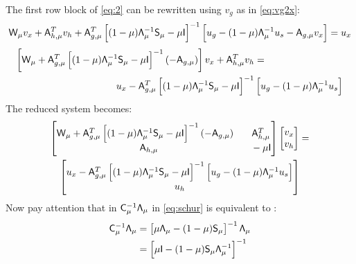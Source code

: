 The first row block of \eqref{eq:2} can be rewritten using $v_g$ as in \eqref{eq:vg2x}:
\begin{equation*}
 \mathsf{W}_\mu v_x +  \mathsf{A}_{h,\mu}^T v_h  + \mathsf{A}_{g,\mu}^T  \left[ (1-\mu)   \mathsf{\Lambda}_\mu ^{-1} \mathsf{S}_\mu   -\mu \mathsf{I} \right]^{-1} \left[  u_g -    (1-\mu) \mathsf{\Lambda}_\mu ^{-1} u_s  -   \mathsf{A}_{g,\mu} v_x   \right] =u_x 
 \end{equation*}
\begin{equation*} 
\begin{aligned}
\left[ \mathsf{W}_\mu +  \mathsf{A}_{g,\mu}^T \left[ (1-\mu) \mathsf{\Lambda}_\mu ^{-1} \mathsf{S}_\mu   -\mu \mathsf{I} \right]^{-1} (-\mathsf{A}_{g,\mu})  \right]v_x  +  \mathsf{A}_{h,\mu}^T v_h &= \\
u_x - \mathsf{A}_{g,\mu}^T \left[ (1-\mu)  \mathsf{\Lambda}_\mu ^{-1} \mathsf{S}_\mu   -\mu \mathsf{I} \right]^{-1}  &\left[ u_g -   (1-\mu)  \mathsf{\Lambda}_\mu ^{-1} u_s  \right] 
\end{aligned}
\end{equation*}
The reduced system becomes: 
\begin{multline}\label{eq:schur_equ}
\begin{bmatrix}
\mathsf{W}_\mu +  \mathsf{A}_{g,\mu}^T \left[(1-\mu)  \mathsf{\Lambda}_\mu ^{-1} \mathsf{S}_\mu   -\mu \mathsf{I} \right]^{-1} (-\mathsf{A}_{g,\mu})    & \phantom{-}\mathsf{A}_{h,\mu}^T   \\
\phantom{-}\mathsf{A}_{h,\mu}  & \phantom{-}-\mu \mathsf{I}
\end{bmatrix}
\begin{bmatrix} v_x \\ v_h  \end{bmatrix} 
= \\
\begin{bmatrix} u_x - \mathsf{A}_{g,\mu}^T \left[ (1-\mu)  \mathsf{\Lambda}_\mu ^{-1} \mathsf{S}_\mu   -\mu \mathsf{I} \right]^{-1} \left[ u_g -    (1-\mu)  \mathsf{\Lambda}_\mu ^{-1} u_s  \right] \\ u_h  \end{bmatrix} 
\end{multline}
Now pay attention that in $\mathsf{C}_\mu^{-1} \mathsf{\Lambda}_\mu $ in  \ref{eq:schur} is equivalent to : 
\begin{equation*}
\begin{aligned}
\mathsf{C}_\mu^{-1} \mathsf{\Lambda}_\mu &=\left[ \mu \mathsf{\Lambda}_\mu - (1-\mu) \mathsf{S}_\mu \right]^{-1}  \mathsf{\Lambda}_\mu \\
	&=  \left[ \mu \mathsf{I} -   (1-\mu) \mathsf{S}_\mu \mathsf{\Lambda}_\mu^{-1} \right]^{-1}
\end{aligned}
\end{equation*}
